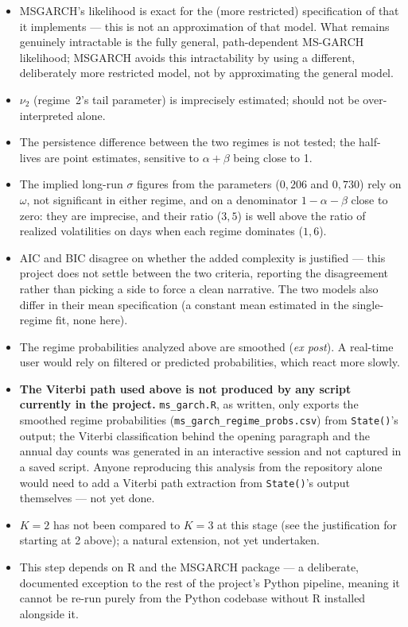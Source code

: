 \documentclass[12pt,a4paper]{article}
\begin{document}
\begin{limitbox}
	\begin{itemize}
		\item MSGARCH's likelihood is exact for the (more
		restricted) specification of \citet{haasmittnikpaolella2004} that it
		implements --- this is not an approximation of that model. What
		remains genuinely intractable is the fully general,
		path-dependent MS-GARCH likelihood; MSGARCH avoids
		this intractability by using a different, deliberately more
		restricted model, not by approximating the
		general model.
		\item $\nu_2$ (regime~2's tail parameter) is imprecisely
		estimated; should not be over-interpreted alone.
		\item The persistence difference between the two regimes is not
		tested; the half-lives are point estimates,
		sensitive to $\alpha+\beta$ being close to 1.
		\item The implied long-run $\sigma$ figures from the
		parameters ($0{,}206$ and $0{,}730$) rely on $\omega$, not
		significant in either regime, and on a denominator
		$1-\alpha-\beta$ close to zero: they are imprecise, and their
		ratio ($3{,}5$) is well above the ratio of realized
		volatilities on days when each regime dominates ($1{,}6$).
		\item AIC and BIC disagree on whether the added
		complexity is justified --- this project does not settle
		between the two criteria, reporting the disagreement rather than
		picking a side to force a clean narrative. The two models also
		differ in their mean specification (a constant mean
		estimated in the single-regime fit, none here).
		\item The regime probabilities analyzed above are smoothed
		(\emph{ex post}). A real-time user would rely on
		filtered or predicted probabilities, which react more
		slowly.
		\item \textbf{The Viterbi path used above is not produced
			by any script currently in the project.}
		\texttt{ms\_garch.R}, as written, only exports the
		smoothed regime probabilities
		(\texttt{ms\_garch\_regime\_probs.csv}) from
		\texttt{State()}'s output; the Viterbi classification behind the
		opening paragraph and the annual day counts was generated
		in an interactive session and not captured in a saved
		script. Anyone reproducing this analysis from the
		repository alone would need to add a Viterbi path
		extraction from \texttt{State()}'s output themselves --- not yet
		done.
		\item $K=2$ has not been compared to $K=3$ at this stage (see
		the justification for starting at 2 above); a
		natural extension, not yet undertaken.
		\item This step depends on R and the MSGARCH package --- a
		deliberate, documented exception to the rest of the
		project's Python pipeline, meaning it cannot be re-run
		purely from the Python codebase without R installed
		alongside it.
	\end{itemize}
\end{limitbox}
\end{document}
